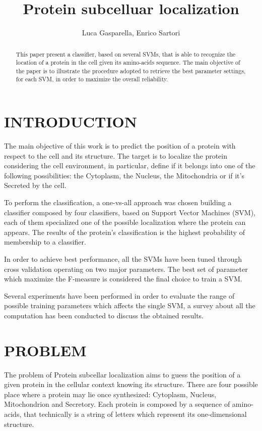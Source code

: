 \documentclass{acm_proc_article-sp-sigmod07}
\begin{document}
\title{Protein subcelluar localization}
\author{Luca Gasparella, Enrico Sartori}

\maketitle

\begin{abstract}
This paper present a classifier, based on several SVMs, that is able to 
recognize the location of a protein in the cell given its amino-acids sequence.
The main objective of the paper is to illustrate the procedure adopted to 
retrieve the best parameter settings, for each SVM, in order to maximize
the overall reliability.
\end{abstract}

\section{INTRODUCTION}
The main objective of this work is to predict the position of a protein with 
respect to the cell and its structure. The target is to localize the protein 
considering the cell environment, in particular, define if it belongs into 
one of the following possibilities: the Cytoplasm, the Nucleus, 
the Mitochondria or if it's Secreted by the cell.

To perform the classification, a one-vs-all approach was chosen building a
classifier composed by four classifiers, based on Support Vector Machines (SVM),
each of them specialized one of the possible localization where the protein can
appears. The results of the protein's classification is the highest probability 
of membership to a classifier.

In order to achieve best performance, all the SVMs have been tuned through 
cross validation operating on two major parameters. The best set of parameter
which maximize the F-measure is considered the final choice to train a
SVM.

Several experiments have been performed in order to evaluate the range of 
possible training parameters which affects the single SVM, a survey about
all the computation has been conducted to discuss the obtained results.


\section{PROBLEM}
The problem of Protein subcellar localization aims to guess the position of a 
given protein in the cellular context knowing its structure. There are four 
possible place where a protein may lie once synthesized: Cytoplasm, Nucleus, 
Mitochondrion and Secretory.  
Each protein is composed by a sequence of amino-acids, that technically is a 
string of letters which represent its one-dimensional structure. 
\end{document}
